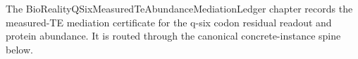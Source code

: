 The BioRealityQSixMeasuredTeAbundanceMediationLedger chapter records the measured-TE mediation certificate for the q-six codon residual readout and protein abundance. It is routed through the canonical concrete-instance spine below.


